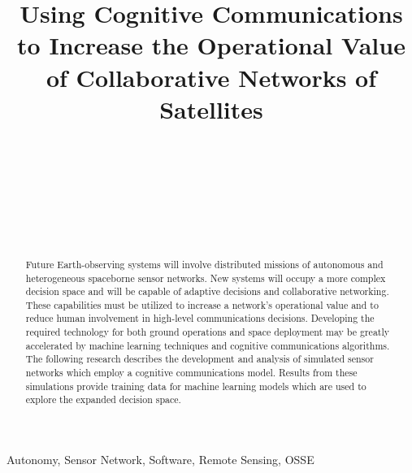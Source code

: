 \documentclass[conference]{IEEEtran}
\title{Using Cognitive Communications to Increase the Operational Value of
  Collaborative Networks of Satellites}
\author{
  \IEEEauthorblockN{Ryan B. Linnabary}
  \IEEEauthorblockA{\thisplace linnabary.24@osu.edu}
  \and
  \IEEEauthorblockN{Andrew J. O'Brien}
  \IEEEauthorblockA{\thisplace obrien.200@osu.edu}
  \and
  \IEEEauthorblockN{Graeme E. Smith}
  \IEEEauthorblockA{\thisplace smith.8347@osu.edu}
  \and
  \IEEEauthorblockN{Christopher Ball}
  \IEEEauthorblockA{\thisplace ball.51@osu.edu}
  \and {~} \and {~~~~~~~~~~~~~~~~}
  \and
  \IEEEauthorblockN{Joel T. Johnson}
  \IEEEauthorblockA{\thisplace johnson.1374@osu.edu}
  \and {~~~~~~} \and {~~~~~~}
}
\begin{document}
\maketitle


\begin{abstract}
  Future Earth-observing systems will involve distributed missions of autonomous
and heterogeneous spaceborne sensor networks.  New systems will occupy a more
complex decision space and will be capable of adaptive decisions and
collaborative networking.  These capabilities must be utilized to increase a
network's operational value and to reduce human involvement in high-level
communications decisions.  Developing the required technology for both ground
operations and space deployment may be greatly accelerated by machine learning
techniques and cognitive communications algorithms.  The following research
describes the development and analysis of simulated sensor networks which employ
a cognitive communications model.  Results from these simulations provide
training data for machine learning models which are used to explore the expanded
decision space.
\end{abstract}

\begin{IEEEkeywords}
  Autonomy, Sensor Network, Software, Remote Sensing, OSSE
\end{IEEEkeywords}
\end{document}
